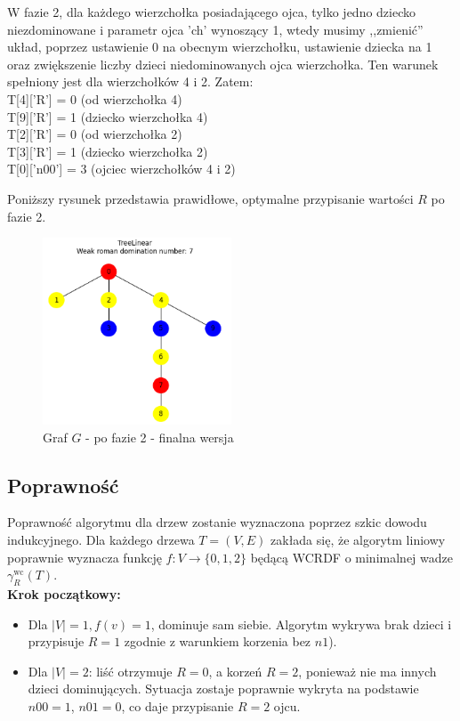 W fazie 2, dla każdego wierzchołka posiadającego ojca, tylko jedno dziecko niezdominowane i parametr ojca 'ch' wynoszący 1, wtedy musimy ,,zmienić'' układ, poprzez ustawienie 0 na obecnym wierzchołku, ustawienie dziecka na 1 oraz zwiększenie liczby dzieci niedominowanych ojca wierzchołka. 
Ten warunek spełniony jest dla wierzchołków 4 i 2. Zatem:\\
T[4]['R'] = 0  (od wierzchołka 4)\\
T[9]['R'] = 1  (dziecko wierzchołka 4)\\
T[2]['R'] = 0  (od wierzchołka 2)\\
T[3]['R'] = 1  (dziecko wierzchołka 2)\\
T[0]['n00'] = 3  (ojciec wierzchołków 4 i 2)

Poniższy rysunek przedstawia prawidłowe, optymalne przypisanie wartości $R$ po fazie 2.\\

\begin{figure}[H]
    \centering
    \includegraphics[width=0.5\textwidth]{assets/phase2.png}
    \caption{Graf $G$ - po fazie 2 - finalna wersja}
    \label{fig:drzewoFaza2}
\end{figure}

\subsection{Poprawność}


Poprawność algorytmu dla drzew zostanie wyznaczona poprzez szkic dowodu indukcyjnego. Dla każdego drzewa $T = (V, E)$ zakłada się, że algorytm liniowy poprawnie wyznacza funkcję $f : V \to \{0,1,2\}$ będącą WCRDF o minimalnej wadze $\gamma_R^{\text{wc}}(T)$.\\

\textbf{Krok początkowy:}
\begin{itemize}
    \item Dla $|V| = 1, f(v)= 1 $, dominuje sam siebie. Algorytm wykrywa brak dzieci i przypisuje $R = 1$ zgodnie z warunkiem korzenia bez $n1$).
    \item Dla $|V| = 2$: liść otrzymuje $R = 0$, a korzeń $R = 2$, ponieważ nie ma innych dzieci dominujących. Sytuacja zostaje poprawnie wykryta na podstawie $n00 = 1$, $n01 = 0$, co daje przypisanie $R=2$ ojcu. 
\end{itemize}

